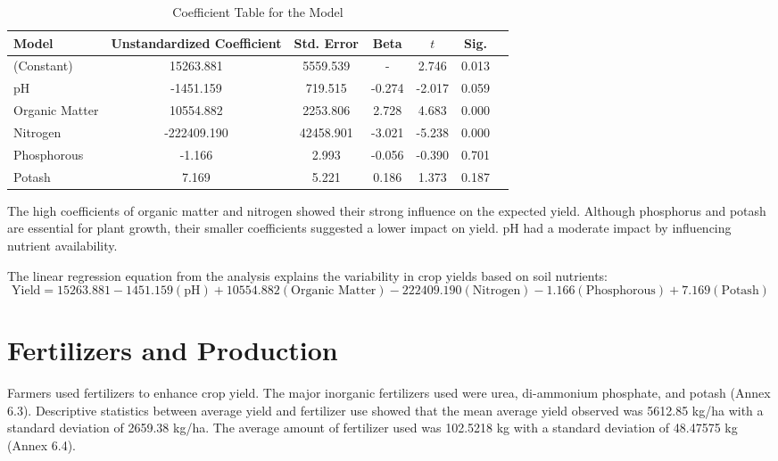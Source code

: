\begin{table}[h]
    \centering
    \caption{Coefficient Table for the Model}
    \label{tab:coefficients}
    \begin{tabular}{lcccccc}
        \toprule
        Model & Unstandardized Coefficient & Std. Error & Beta & $t$ & Sig. \\
        \midrule
        (Constant) & 15263.881 & 5559.539 & - & 2.746 & 0.013 \\
        pH & -1451.159 & 719.515 & -0.274 & -2.017 & 0.059 \\
        Organic Matter & 10554.882 & 2253.806 & 2.728 & 4.683 & 0.000 \\
        Nitrogen & -222409.190 & 42458.901 & -3.021 & -5.238 & 0.000 \\
        Phosphorous & -1.166 & 2.993 & -0.056 & -0.390 & 0.701 \\
        Potash & 7.169 & 5.221 & 0.186 & 1.373 & 0.187 \\
        \bottomrule
    \end{tabular}
\end{table}

The high coefficients of organic matter and nitrogen showed their strong influence on the expected yield. Although phosphorus and potash are essential for plant growth, their smaller coefficients suggested a lower impact on yield. pH had a moderate impact by influencing nutrient availability.

The linear regression equation from the analysis explains the variability in crop yields based on soil nutrients:
\begin{equation}
    \text{Yield} = 15263.881 - 1451.159 (\text{pH}) + 10554.882 (\text{Organic Matter}) - 222409.190 (\text{Nitrogen}) - 1.166 (\text{Phosphorous}) + 7.169 (\text{Potash})
\end{equation}

\section{Fertilizers and Production}

Farmers used fertilizers to enhance crop yield. The major inorganic fertilizers used were urea, di-ammonium phosphate, and potash (Annex 6.3). Descriptive statistics between average yield and fertilizer use showed that the mean average yield observed was 5612.85 kg/ha with a standard deviation of 2659.38 kg/ha. The average amount of fertilizer used was 102.5218 kg with a standard deviation of 48.47575 kg (Annex 6.4).

